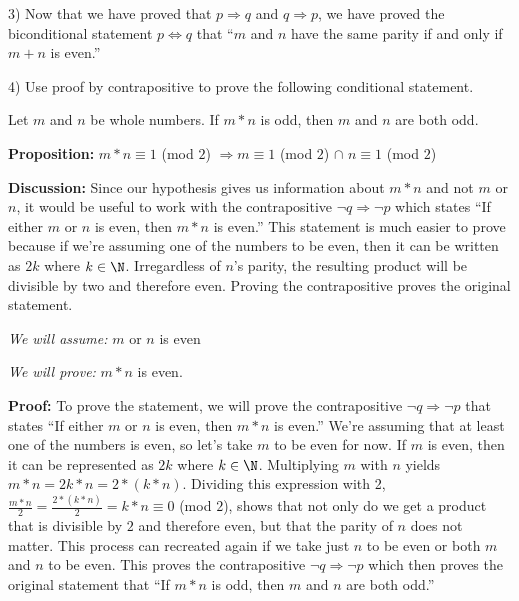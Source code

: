 \begin{paragraph}{3)}
		Now that we have proved that $p \Rightarrow q$ and $q \Rightarrow p$, we have proved the biconditional statement
		$p \iff q$ that ``$m$ and $n$ have the same parity if and only if $m + n$ is even.'' 
		
		\proofEnd
	
	\end{paragraph}

	\begin{paragraph}{4)}
		Use proof by contrapositive to prove the following conditional statement.
 		\begin{center}
			Let $m$ and $n$ be whole numbers. If $m * n$ is odd, then $m$ and $n$ are both odd.
		\end{center}
		
		\separate\spacing

		\textbf{Proposition:} $m * n \equiv 1$ (mod $2$) $\Rightarrow m \equiv 1$ (mod $2$) $\cap$ $n \equiv 1$ (mod $2$) \spacing

		\textbf{Discussion:} Since our hypothesis gives us information about $m * n$ and not $m$ or $n$, it would 
		be useful to work with the contrapositive $\neg q \Rightarrow \neg p$ which states ``If either $m$ or $n$ is even,
		then $m * n$ is even.'' This statement is much easier to prove because if we're assuming one of the numbers to be even,
		then it can be written as $2k$ where $k \in \N$. Irregardless of $n$'s parity, the resulting product will be divisible by two
		and therefore even. Proving the contrapositive proves the original statement. 
		 
		\textit{We will assume:} $m$ or $n$ is even
		 
		\textit{We will prove:} $m * n$ is even. \spacing

		\textbf{Proof:} To prove the statement, we will prove the contrapositive $\neg q \Rightarrow \neg p$
		that states ``If either $m$ or $n$ is even, then $m * n$ is even.'' We're assuming that at 
		least one of the numbers is even, so let's take $m$ to be even for now. If $m$ is even, then
		it can be represented as $2k$ where $k \in \N$. Multiplying $m$ with $n$ yields 
		$m * n = 2k * n = 2 * (k * n)$. Dividing this expression with 2, $\frac{m * n}{2} = 
		\frac{2 * (k * n)}{2} = k * n \equiv 0$ (mod $2$), shows that not only do
		we get a product that is divisible by $2$ and therefore even, but that the parity of $n$ does not matter.
		This process can recreated again if we take just $n$ to be even or both $m$ and $n$ to be even. 
		This proves the contrapositive $\neg q \Rightarrow \neg p$ which then proves the original 
		statement that ``If $m * n$ is odd, then $m$ and $n$ are both odd.''

		\proofEnd

	\end{paragraph}

